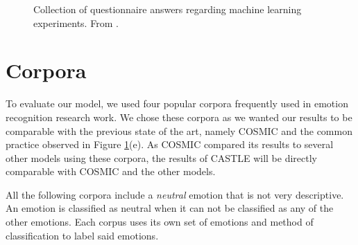 \documentclass[nofilelist]{cslthse-msc}
\begin{document}
\begin{figure}[!ht]
\hfil
{}
\caption{Collection of questionnaire answers regarding machine learning experiments. From \citet{bouthillier:hal-02447823}.}
\label{fig:HAL}
\end{figure}



\section{Corpora}

To evaluate our model, we used four popular corpora frequently used in emotion recognition research work. We chose these corpora as we wanted our results to be comparable with the previous state of the art, namely COSMIC and the common practice observed in Figure \ref{fig:HAL}(e). As COSMIC compared its results to several other models using these corpora, the results of CASTLE will be directly comparable with COSMIC and the other models. 

All the following corpora include a \textit{neutral} emotion that is not very descriptive. An emotion is classified as neutral when it can not be classified as any of the other emotions. Each corpus uses its own set of emotions and method of classification to label said emotions. 
\end{document}
